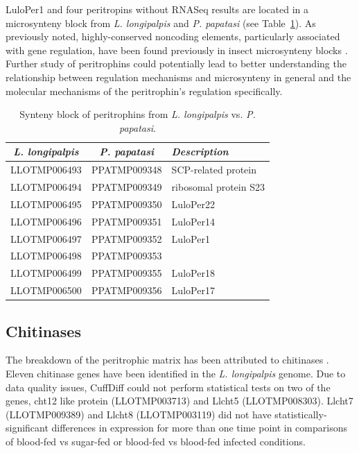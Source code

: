 LuloPer1 and four peritropins without RNASeq results are located in a microsynteny block from \emph{L. longipalpis} and \emph{P. papatasi} (see Table~\ref{tab:synteny-llot-ppat-peritrophic}). As previously noted, highly-conserved noncoding elements, particularly associated with gene regulation, have been found previously in insect microsynteny blocks \cite{Engstrom2007}.  Further study of peritrophins could potentially lead to  better understanding the relationship between regulation mechanisms and microsynteny in general and the molecular mechanisms of the peritrophin's regulation specifically.

\begin{table}[H]
  \centering
  \begin{tabular}{c c l} \hline
    \emph{L. longipalpis} & \emph{P. papatasi} & \emph{Description} \\ \hline
    LLOTMP006493 & PPATMP009348 & SCP-related protein \\
    LLOTMP006494 & PPATMP009349 & ribosomal protein S23 \\
    LLOTMP006495 & PPATMP009350 & LuloPer22 \\
    LLOTMP006496 & PPATMP009351 & LuloPer14 \\
    LLOTMP006497 & PPATMP009352 & LuloPer1 \\
    LLOTMP006498 & PPATMP009353 &  \\
    LLOTMP006499 & PPATMP009355 & LuloPer18 \\
    LLOTMP006500 & PPATMP009356 & LuloPer17
  \end{tabular}
  \caption{Synteny block of peritrophins from \emph{L. longipalpis} vs. \emph{P. papatasi}.}
  \label{tab:synteny-llot-ppat-peritrophic}
\end{table}


\subsection{Chitinases}
The breakdown of the peritrophic matrix has been attributed to chitinases \cite{Dostalova2012}. Eleven chitinase genes have been identified in the \emph{L. longipalpis} genome. Due to data quality issues, CuffDiff could not perform statistical tests on two of the genes, cht12 like protein (LLOTMP003713) and Llcht5 (LLOTMP008303). Llcht7 (LLOTMP009389) and Llcht8 (LLOTMP003119) did not have statistically-significant differences in expression for more than one time point in comparisons of blood-fed vs sugar-fed or blood-fed vs blood-fed infected conditions.

